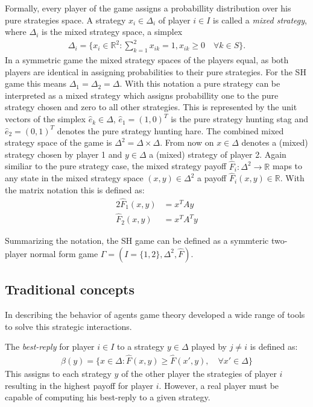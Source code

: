 \documentclass[11pt]{article}
\newcommand{\realnumb}{\mathbb{R}}
\begin{document}
Formally, every player of the game assigns a probabillity distribution over
his pure strategies space. A strategy $x_i \in \Delta_i$ of 
player $i \in I$ is called a \textit{mixed strategy}, where $\Delta_i$ is 
the mixed strategy space, a simplex
\begin{align*}
        \Delta_i = \{ x_i \in \realnumb^2 : \sum_{k=1}^2 x_{ik} = 1, x_{ik} \geq 0 \quad
\forall k \in S\}.
\end{align*}
In a symmetric game the mixed strategy spaces of the players
equal, as both players are identical in assigning probabilities to their
pure strategies. For the SH game this means $\Delta_1 = \Delta_2 = \Delta$.
With this notation a pure strategy can be interpreted as a mixed strategy
which assigns probabillity one to the pure strategy chosen and zero to all
other strategies. This is represented by the unit vectors of the simplex 
$\hat{e}_k \in \Delta$, $\hat{e}_1 = (1,0)^T$ is the pure strategy hunting stag 
and $\hat{e}_2 =(0,1)^T$ denotes the pure strategy hunting hare.
The combined mixed strategy space of the game is $\Delta^2 = \Delta \times
\Delta$.
From now on $x \in \Delta$ denotes a (mixed) strategy
chosen by player 1 and $y \in \Delta$ a (mixed) strategy of player 2.
Again similiar to the pure strategy case, the mixed strategy payoff 
$\hat{F}_i:\Delta^2 \rightarrow \realnumb$ maps to any state in the mixed strategy
space  $(x,y) \in \Delta^2$ a payoff $\hat{F}_i(x,y) \in \realnumb$.
With the matrix notation this is defined as: 
\begin{alignat*}{2}
        \hat{F}_1(x,y) &= x^T A y \\
        \hat{F}_2(x,y) &= x^T A^T y 
\end{alignat*}

Summarizing the notation, the SH game can be defined as a symmteric two-player
normal form game $\Gamma = (I=\{1,2\}, \Delta^2, \hat{F})$.

\subsection{Traditional concepts}
\label{sec:traditionalconcepts}
In describing the behavior of agents game theory developed a wide range of 
tools to solve this strategic interactions. 

The \textit{best-reply} for player $i \in I$ to a strategy $y \in \Delta$ 
played by $j \neq i$ is defined as:
\begin{align}
        \beta(y) = \{x \in \Delta: \hat{F}(x,y) \geq \hat{F}(x',y), 
        \quad \forall x' \in \Delta\}
\end{align}
This assigns to each strategy $y$ of the other player the strategies
of player $i$ resulting in the highest payoff for player $i$. However, a 
real player must be capable of computing his best-reply to a given strategy.
\end{document}
